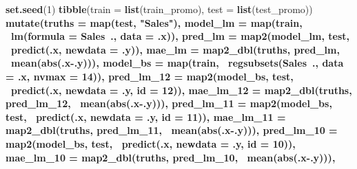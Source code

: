 \documentclass[]{article}
\newenvironment{Shaded}{\begin{snugshade}}{\end{snugshade}}
\newcommand{\DataTypeTok}[1]{\textcolor[rgb]{0.13,0.29,0.53}{#1}}
\newcommand{\DecValTok}[1]{\textcolor[rgb]{0.00,0.00,0.81}{#1}}
\newcommand{\KeywordTok}[1]{\textcolor[rgb]{0.13,0.29,0.53}{\textbf{#1}}}
\newcommand{\NormalTok}[1]{#1}
\newcommand{\OperatorTok}[1]{\textcolor[rgb]{0.81,0.36,0.00}{\textbf{#1}}}
\newcommand{\StringTok}[1]{\textcolor[rgb]{0.31,0.60,0.02}{#1}}
\begin{document}
\begin{Shaded}
\begin{Highlighting}[]
\KeywordTok{set.seed}\NormalTok{(}\DecValTok{1}\NormalTok{)}
\KeywordTok{tibble}\NormalTok{(}\DataTypeTok{train =} \KeywordTok{list}\NormalTok{(train_promo), }\DataTypeTok{test =} \KeywordTok{list}\NormalTok{(test_promo)) }\OperatorTok{%>%}\StringTok{ }
\StringTok{  }\KeywordTok{mutate}\NormalTok{(}\DataTypeTok{truths =} \KeywordTok{map}\NormalTok{(test, }\StringTok{"Sales"}\NormalTok{),}
         \DataTypeTok{model_lm =} \KeywordTok{map}\NormalTok{(train, }\OperatorTok{~}\KeywordTok{lm}\NormalTok{(}\DataTypeTok{formula =}\NormalTok{ Sales}\OperatorTok{~}\NormalTok{., }\DataTypeTok{data =}\NormalTok{ .x)),}
         \DataTypeTok{pred_lm =} \KeywordTok{map2}\NormalTok{(model_lm, test, }\OperatorTok{~}\KeywordTok{predict}\NormalTok{(.x, }\DataTypeTok{newdata =}\NormalTok{ .y)),}
         \DataTypeTok{mae_lm =} \KeywordTok{map2_dbl}\NormalTok{(truths, pred_lm, }\OperatorTok{~}\KeywordTok{mean}\NormalTok{(}\KeywordTok{abs}\NormalTok{(.x}\OperatorTok{-}\NormalTok{.y))),}
         \DataTypeTok{model_bs =} \KeywordTok{map}\NormalTok{(train, }\OperatorTok{~}\KeywordTok{regsubsets}\NormalTok{(Sales}\OperatorTok{~}\NormalTok{., }\DataTypeTok{data =}\NormalTok{ .x, }\DataTypeTok{nvmax =} \DecValTok{14}\NormalTok{)),}
         \DataTypeTok{pred_lm_12 =} \KeywordTok{map2}\NormalTok{(model_bs, test, }\OperatorTok{~}\KeywordTok{predict}\NormalTok{(.x, }\DataTypeTok{newdata =}\NormalTok{ .y, }\DataTypeTok{id =} \DecValTok{12}\NormalTok{)),}
         \DataTypeTok{mae_lm_12 =} \KeywordTok{map2_dbl}\NormalTok{(truths, pred_lm_}\DecValTok{12}\NormalTok{, }\OperatorTok{~}\KeywordTok{mean}\NormalTok{(}\KeywordTok{abs}\NormalTok{(.x}\OperatorTok{-}\NormalTok{.y))),}
         \DataTypeTok{pred_lm_11 =} \KeywordTok{map2}\NormalTok{(model_bs, test, }\OperatorTok{~}\KeywordTok{predict}\NormalTok{(.x, }\DataTypeTok{newdata =}\NormalTok{ .y, }\DataTypeTok{id =} \DecValTok{11}\NormalTok{)),}
         \DataTypeTok{mae_lm_11 =} \KeywordTok{map2_dbl}\NormalTok{(truths, pred_lm_}\DecValTok{11}\NormalTok{, }\OperatorTok{~}\KeywordTok{mean}\NormalTok{(}\KeywordTok{abs}\NormalTok{(.x}\OperatorTok{-}\NormalTok{.y))),}
         \DataTypeTok{pred_lm_10 =} \KeywordTok{map2}\NormalTok{(model_bs, test, }\OperatorTok{~}\KeywordTok{predict}\NormalTok{(.x, }\DataTypeTok{newdata =}\NormalTok{ .y, }\DataTypeTok{id =} \DecValTok{10}\NormalTok{)),}
         \DataTypeTok{mae_lm_10 =} \KeywordTok{map2_dbl}\NormalTok{(truths, pred_lm_}\DecValTok{10}\NormalTok{, }\OperatorTok{~}\KeywordTok{mean}\NormalTok{(}\KeywordTok{abs}\NormalTok{(.x}\OperatorTok{-}\NormalTok{.y))),}
}
\end{Highlighting}
\end{Shaded}
\end{document}
